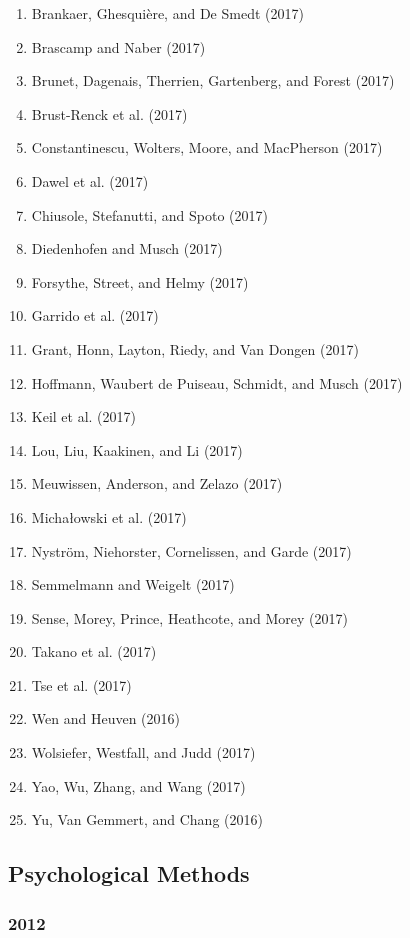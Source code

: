 \documentclass[english,man]{apa6}
\providecommand{\tightlist}{%
  \setlength{\itemsep}{0pt}\setlength{\parskip}{0pt}}
\theoremstyle{definition}
\theoremstyle{definition}
\theoremstyle{definition}
\theoremstyle{remark}
\begin{document}
\begin{enumerate}
\def\labelenumi{\arabic{enumi})}
\tightlist
\item
  Brankaer, Ghesquière, and De Smedt (2017)
\item
  Brascamp and Naber (2017)
\item
  Brunet, Dagenais, Therrien, Gartenberg, and Forest (2017)
\item
  Brust-Renck et al. (2017)
\item
  Constantinescu, Wolters, Moore, and MacPherson (2017)
\item
  Dawel et al. (2017)
\item
  Chiusole, Stefanutti, and Spoto (2017)
\item
  Diedenhofen and Musch (2017)
\item
  Forsythe, Street, and Helmy (2017)
\item
  Garrido et al. (2017)
\item
  Grant, Honn, Layton, Riedy, and Van Dongen (2017)
\item
  Hoffmann, Waubert de Puiseau, Schmidt, and Musch (2017)
\item
  Keil et al. (2017)
\item
  Lou, Liu, Kaakinen, and Li (2017)
\item
  Meuwissen, Anderson, and Zelazo (2017)
\item
  Michałowski et al. (2017)
\item
  Nyström, Niehorster, Cornelissen, and Garde (2017)
\item
  Semmelmann and Weigelt (2017)
\item
  Sense, Morey, Prince, Heathcote, and Morey (2017)
\item
  Takano et al. (2017)
\item
  Tse et al. (2017)
\item
  Wen and Heuven (2016)
\item
  Wolsiefer, Westfall, and Judd (2017)
\item
  Yao, Wu, Zhang, and Wang (2017)
\item
  Yu, Van Gemmert, and Chang (2016)
\end{enumerate}

\subsection{Psychological Methods}\label{psychological-methods}

\subsubsection{2012}\label{section-34}
\end{document}
